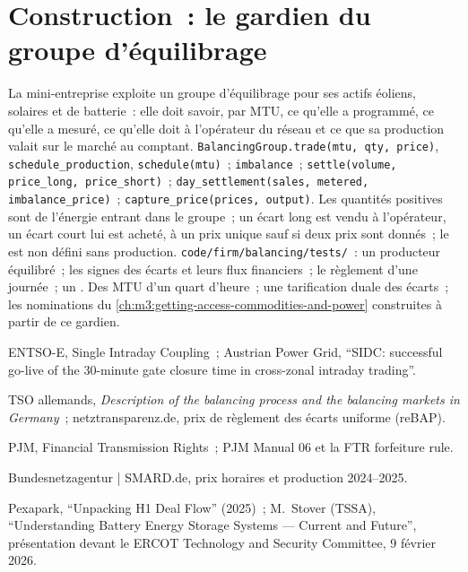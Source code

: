\section{Construction~: le gardien du groupe d'équilibrage}\label{bld:m3:power-markets-trading:balancing}

\begin{build}
 La mini-entreprise exploite un groupe d'équilibrage pour ses actifs éoliens, solaires
et de batterie~: elle doit savoir, par MTU, ce qu'elle a programmé, ce qu'elle a mesuré, ce qu'elle doit
à l'opérateur du réseau et ce que sa production valait sur le marché au comptant.
 \texttt{BalancingGroup.trade(mtu, qty, price)},
\texttt{schedule\_production}, \texttt{schedule(mtu)}~; \texttt{imbalance}~;
\texttt{settle(volume, price\_long, price\_short)}~; \texttt{day\_settlement(sales, metered,
imbalance\_price)}~; \texttt{capture\_price(prices, output)}.
 Les quantités positives sont de l'énergie entrant dans le groupe~; un écart long est vendu à
l'opérateur, un écart court lui est acheté, à un prix unique sauf si deux prix sont donnés~; le  est
non défini sans production.
 \texttt{code/firm/balancing/tests/}~: un producteur équilibré~; les signes des
écarts et leurs flux financiers~; le règlement d'une journée~; un .
 Des MTU d'un quart d'heure~; une tarification duale des écarts~; les nominations
du \cref{ch:m3:getting-access-commodities-and-power} construites à partir de ce gardien.
\end{build}

\begin{omsources}
\item ENTSO-E, Single Intraday Coupling~; Austrian Power Grid,
``SIDC: successful go-live of the 30-minute gate closure time in cross-zonal intraday trading''.
\item TSO allemands, \emph{Description of the balancing process and the balancing markets in
Germany}~; netztransparenz.de, prix de règlement des écarts uniforme (reBAP).
\item PJM, Financial Transmission Rights~; PJM Manual 06 et la FTR forfeiture rule.
\item Bundesnetzagentur | SMARD.de, prix horaires et production 2024--2025.
\item Pexapark, ``Unpacking H1 Deal Flow'' (2025)~; M.~Stover (TSSA), ``Understanding Battery Energy Storage Systems --- Current and Future'',
présentation devant le ERCOT Technology and Security Committee, 9 février 2026.
\end{omsources}

